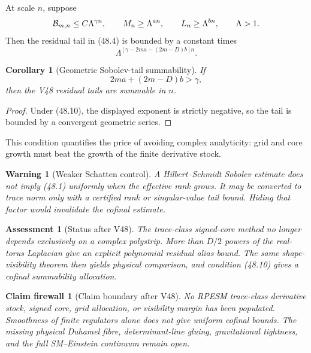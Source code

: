 \documentclass[11pt]{article}
\newtheorem{corollary}[theorem]{Corollary}
\newtheorem{warning}[theorem]{Warning}
\newtheorem{firewall}[theorem]{Claim firewall}
\newtheorem{assessment}[theorem]{Assessment}
\theoremstyle{remark}
\begin{document}
At scale \(n\), suppose
\[
 {\cal B}_{m,n}\leq C\Lambda^{\gamma n},\qquad
 M_n\geq\Lambda^{an},\qquad
 L_n\geq\Lambda^{bn},
 \qquad\Lambda>1.
\]
Then the residual tail in (48.4) is bounded by a constant times
\[
 \Lambda^{[
 \gamma-2ma-(2m-D)b]n}.
\]

\begin{corollary}[Geometric Sobolev-tail summability]
\label{cor:v12v48-cofinal}
If
\begin{equation}
                         2ma+(2m-D)b>\gamma,      \tag{48.10}
\end{equation}
then the V48 residual tails are summable in \(n\).
\end{corollary}

\begin{proof}
Under (48.10), the displayed exponent is strictly negative, so the
tail is bounded by a convergent geometric series.
\end{proof}

This condition quantifies the price of avoiding complex analyticity:
grid and core growth must beat the growth of the finite derivative
stock.

\begin{warning}[Weaker Schatten control]
\label{warn:v12v48-Schatten}
A Hilbert--Schmidt Sobolev estimate does not imply (48.1) uniformly
when the effective rank grows.  It may be converted to trace norm
only with a certified rank or singular-value tail bound.  Hiding that
factor would invalidate the cofinal estimate.
\end{warning}

\begin{assessment}[Status after V48]
\label{ass:v12v48-status}
The trace-class signed-core method no longer depends exclusively on
a complex polystrip.  More than \(D/2\) powers of the real-torus
Laplacian give an explicit polynomial residual alias bound.  The
same shape-visibility theorem then yields physical comparison, and
condition (48.10) gives a cofinal summability allocation.
\end{assessment}

\begin{firewall}[Claim boundary after V48]
\label{fire:v12v48-claim}
No RPESM trace-class derivative stock, signed core, grid allocation,
or visibility margin has been populated.  Smoothness of finite
regulators alone does not give uniform cofinal bounds.  The missing
physical Duhamel fibre, determinant-line gluing, gravitational
tightness, and the full SM--Einstein continuum remain open.
\end{firewall}
\end{document}

